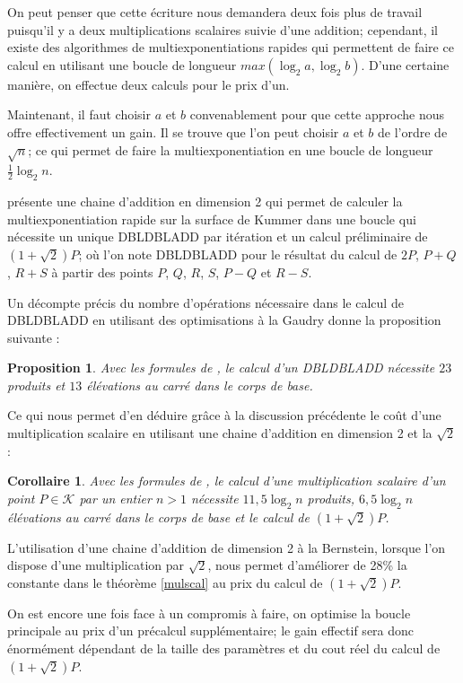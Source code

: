\documentclass[a4paper,12pt]{article}
\newtheorem{proposition}[theoreme]{Proposition}
\newtheorem{corollaire}[theoreme]{Corollaire}
\theoremstyle{definition}
\theoremstyle{remark}
\numberwithin{equation}{section}
\begin{document}
On peut penser que cette écriture nous demandera deux fois plus de travail puisqu'il y a deux multiplications scalaires suivie d'une addition; cependant, il existe des algorithmes de multiexponentiations rapides qui permettent de faire ce calcul en utilisant une boucle de longueur $max(\log_2 a, \log_2 b)$. D'une certaine manière, on effectue deux calculs pour le prix d'un.

Maintenant, il faut choisir $a$ et $b$ convenablement pour que cette approche nous offre effectivement un gain. Il se trouve que l'on peut choisir $a$ et $b$ de l'ordre de $\sqrt{n}$; ce qui permet de faire la multiexponentiation en une boucle de longueur $\frac{1}{2}\log_2 n$.

\citet{bernstein} présente une chaine d'addition en dimension 2 qui permet de calculer la multiexponentiation rapide sur la surface de Kummer dans une boucle qui nécessite un unique DBLDBLADD par itération et un calcul préliminaire de $(1+\sqrt{2})P$; où l'on note DBLDBLADD pour le résultat du calcul de $2P$, $P+Q$, $R+S$ à partir des points $P$, $Q$, $R$, $S$, $P-Q$ et $R-S$.

Un décompte précis du nombre d'opérations nécessaire dans le calcul de DBLDBLADD en utilisant des optimisations à la Gaudry donne la proposition suivante :
\begin{proposition}
Avec les formules de \citep{gaudry}, le calcul d'un DBLDBLADD nécessite $23$ produits et $13$ élévations au carré dans le corps de base.
\end{proposition}

Ce qui nous permet d'en déduire grâce à la discussion précédente le coût d'une multiplication scalaire en utilisant une chaine d'addition en dimension 2 et la $\sqrt{2}$ :
\begin{corollaire}
Avec les formules de \citep{gaudry}, le calcul d'une multiplication scalaire d'un point $P \in \mathcal{K}$ par un entier $n > 1$ nécessite $11,5\log_2 n$ produits, $6,5\log_2 n$ élévations au carré dans le corps de base et le calcul de $(1+\sqrt{2})P$.
\end{corollaire}

L'utilisation d'une chaine d'addition de dimension 2 à la Bernstein, lorsque l'on dispose d'une multiplication par $\sqrt{2}$, nous permet d'améliorer de 28\% la constante dans le théorème \ref{mulscal} au prix du calcul de $(1+\sqrt{2})P$.

On est encore une fois face à un compromis à faire, on optimise la boucle principale au prix d'un précalcul supplémentaire; le gain effectif sera donc énormément dépendant de la taille des paramètres et du cout réel du calcul de $(1+\sqrt{2})P$.
\end{document}
